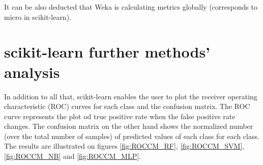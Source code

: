 It can be also deducted that Weka is calculating metrics globally (corresponds to micro in scikit-learn).

\section{scikit-learn further methods' analysis}

In addition to all that, scikit-learn enables the user to plot the receiver operating characteristic (ROC) curves for each class and the confusion matrix. The ROC curve represents the plot od true positive rate when the false positive rate changes. The confusion matrix on the other hand shows the normalized number (over the total number of samples) of predicted values of each class for each class. The results are illustrated on figures \ref{fig:ROCCM_RF}, \ref{fig:ROCCM_SVM}, \ref{fig:ROCCM_NB} and \ref{fig:ROCCM_MLP}.


